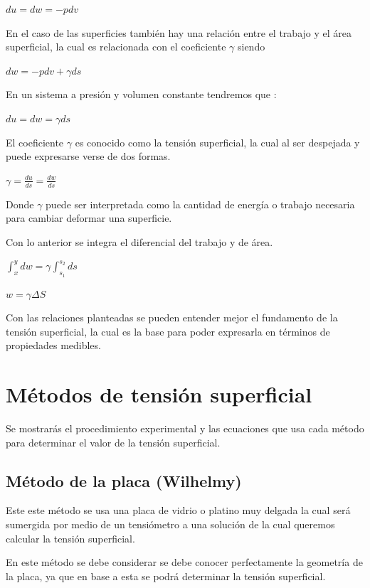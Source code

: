 \documentclass[10pt]{report}
\newcommand{\ec}[1]{\begin{center} $#1$ \end{center}}
\begin{document}
    \ec{du = dw = -pdv}

    En el caso de las superficies también hay una relación entre el trabajo y el área superficial, la cual es relacionada con el coeficiente $\gamma$ siendo 
    
    \ec{dw = -pdv+\gamma ds}

    En un sistema a presión y volumen constante tendremos que :

    \ec{du = dw = \gamma ds}

    El coeficiente $\gamma$ es conocido como la tensión superficial, la cual al ser despejada y puede expresarse verse de dos formas.

    \ec{\gamma = \frac{du}{ds} = \frac{dw}{ds}}

    Donde $\gamma$ puede ser interpretada como la cantidad de energía o trabajo necesaria para cambiar deformar una superficie.

    Con lo anterior se integra el diferencial del trabajo y de área.

    \ec{\int_{x}^y dw = \gamma \int_{s_1}^{s_2} ds} 

    \ec{w = \gamma \Delta S} 

    Con las relaciones planteadas se pueden entender mejor el fundamento de la tensión superficial, la cual es la base para poder expresarla en términos de propiedades medibles.

    \section*{Métodos de tensión superficial \cite{web:metodos12} \cite{web:metodosandes} \cite{web:metodosMadridi} \cite{web:metodosInge}}

    Se mostrarás el procedimiento experimental y las ecuaciones que usa cada método para determinar el valor de la tensión superficial.

    \subsection*{Método de la placa (Wilhelmy)}

    Este este método se usa una placa de vidrio o platino muy delgada la cual será sumergida por medio de un tensiómetro a una solución de la cual queremos calcular la tensión superficial.

    En este método se debe considerar se debe conocer perfectamente la geometría de la placa, ya que en base a esta se podrá determinar la tensión superficial.
\end{document}
